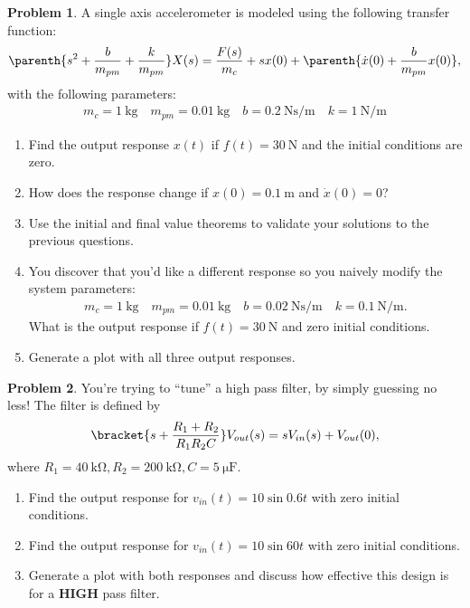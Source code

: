 \documentclass[10pt]{article}
\theoremstyle{definition}
\newtheorem{prob}{Problem}[section]
\newenvironment{subprob}%
{\renewcommand{\theenumi}{\alph{enumi}}\renewcommand{\labelenumi}{(\theenumi)}\begin{enumerate}}%
{\end{enumerate}}%
\begin{document}
\begin{prob}
    A single axis accelerometer is modeled using the following transfer function:
    \begin{align}
        \parenth{s^2 + \frac{b}{m_{pm}} + \frac{k}{m_{pm}}} X(s) = \frac{F(s)}{m_c} + s x(0) + \parenth{\dot{x}(0) + \frac{b}{m_{pm}} x(0)},
    \end{align}
    with the following parameters:
    \begin{align*}
        m_c = \SI{1}{\kilo\gram} \quad m_{pm} = \SI{0.01}{\kilo\gram} \quad b = \SI{0.2}{\newton\second\per\meter} \quad k = \SI{1}{\newton\per\meter}
    \end{align*}

    \begin{subprob}
        \item Find the output response \( x(t) \) if \( f(t) = \SI{30}{\newton}\) and the initial conditions are zero.
        \item How does the response change if \( x(0) = \SI{0.1}{\meter} \) and \( \dot{x}(0) = 0 \)?
        \item Use the initial and final value theorems to validate your solutions to the previous questions.
        \item You discover that you'd like a different response so you naively modify the system parameters:
            \begin{align*}
        m_c = \SI{1}{\kilo\gram} \quad m_{pm} = \SI{0.01}{\kilo\gram} \quad b = \SI{0.02}{\newton\second\per\meter} \quad k = \SI{0.1}{\newton\per\meter}.
            \end{align*}
            What is the output response if \( f(t) = \SI{30}{\newton} \) and zero initial conditions. 
        \item Generate a plot with all three output responses.
    \end{subprob}
\end{prob}
   
\begin{prob}
    You're trying to ``tune'' a high pass filter,  by simply guessing no less!
    The filter is defined by
    \begin{align}
    \bracket{s + \frac{R_1 + R_2}{R_1 R_2 C} } V_{out}(s) = s V_{in}(s) + V_{out}(0) ,
    \end{align}
    where \( R_1 = \SI{40}{\kilo\ohm}, R_2 = \SI{200}{\kilo\ohm}, C = \SI{5}{\micro\farad}\).
    \begin{subprob}
    \item Find the output response for \( v_{in}(t) = 10 \sin 0.6 t \) with zero initial conditions.
    \item Find the output response for \( v_{in}(t) = 10 \sin 60 t \) with zero initial conditions.
    \item  Generate a plot with both responses and discuss how effective this design is for a \textbf{HIGH} pass filter.
    \end{subprob}
\end{prob}
\end{document}
